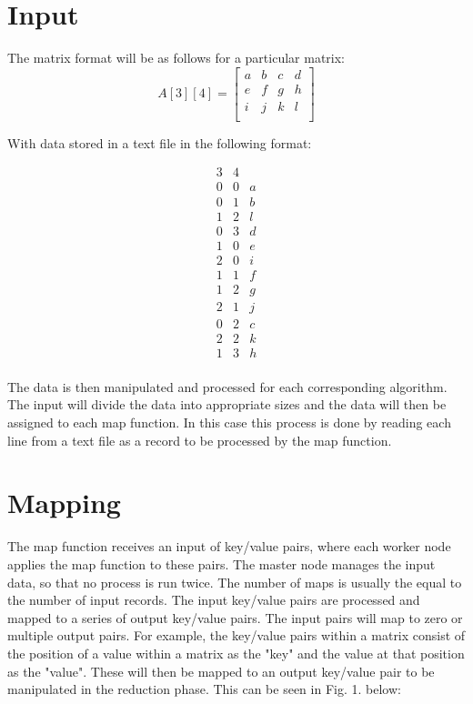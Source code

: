 \documentclass[conference]{IEEEtran}
\begin{document}
\section{Input}

\noindent The matrix format will be as follows for a particular matrix:\\
\begin{equation*}
A[3][4] =
\begin{bmatrix}
a       &b      &c      &d\\
e       &f      &g      &h\\
i       &j      &k      &l\\
\end{bmatrix}
\end{equation*}

\noindent With data stored in a text file in the following format:

\begin{equation*}
\begin{matrix}
3       &4      & \\
0       &0      &a\\
0       &1      &b\\
1       &2      &l\\
0       &3      &d\\
1       &0      &e\\
2       &0      &i\\
1       &1      &f\\
1       &2      &g\\
2       &1      &j\\
0       &2      &c\\
2       &2      &k\\
1       &3      &h\\
\end{matrix}
\end{equation*}

\noindent The data is then manipulated and processed for each corresponding algorithm. The input will divide the data into appropriate sizes and the data will then be assigned to each map function. In this case this process is done by reading each line from a text file as a record to be processed by the map function.\\

\section{Mapping}

\noindent The map function receives an input of key/value pairs, where each worker node applies the map function to these pairs. The master node manages the input data, so that no process is run twice. The number of maps is usually the equal to the number of input records. The input key/value pairs are processed and mapped to a series of output key/value pairs. The input pairs will map to zero or multiple output pairs. For example, the key/value pairs within a matrix consist of the position of a value within a matrix as the "key" and the value at that position as the "value". These will then be mapped to an output key/value pair to be manipulated in the reduction phase. This can be seen in Fig. 1. below:
\end{document}
